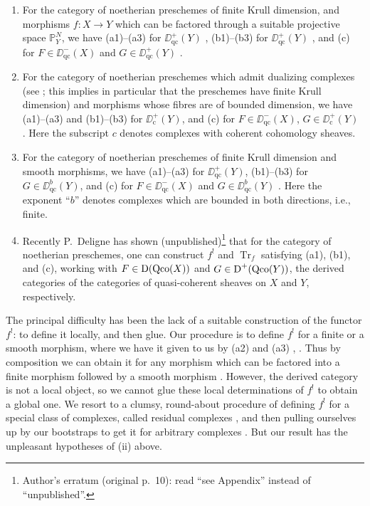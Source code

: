 \begin{enumerate}
	\item[(i)] For the category of noetherian preschemes of finite Krull dimension, and morphisms $f\colon X\to Y$ which can be factored through a suitable projective space $\mathbb{P}_{Y}^{N}$, we have (a1)--(a3) for $\DD_{\mathrm{qc}}^{+}(Y)$ , (b1)--(b3) for $\DD_{\mathrm{qc}}^{+}(Y)$ , and (c) for $F\in \DD_{\mathrm{qc}}^{-}(X)$ and $G\in \DD_{\mathrm{qc}}^{+}(Y)$ .
	
	\item[(ii)] For the category of noetherian preschemes which admit dualizing complexes (see ; this implies in particular that the preschemes have finite Krull dimension) and morphisms whose fibres are of bounded dimension, we have (a1)--(a3) and (b1)--(b3) for $\DD_{\mathrm{c}}^{+}(Y)$, and (c) for $F\in \DD_{\mathrm{qc}}^{-}(X)$, $G\in \DD_{\mathrm{c}}^{+}(Y)$ . Here the subscript $c$ denotes complexes with coherent cohomology sheaves.
	
	\item[(iii)] For the category of noetherian preschemes of finite Krull dimension and smooth morphisms, we have (a1)--(a3) for $\DD_{\mathrm{qc}}^{+}(Y)$, (b1)--(b3) for $G\in \DD_{\mathrm{qc}}^{b}(Y)$, and (c) for $F\in \DD_{\mathrm{qc}}^{-}(X)$ and $G\in \DD_{\mathrm{qc}}^{b}(Y)$ . Here the exponent ``$b$'' denotes complexes which are bounded in both directions, i.e., finite.
	
	\item[(iv)] Recently P.~Deligne has shown (unpublished)\footnote{Author's erratum (original p.~10): read ``see Appendix'' instead of ``unpublished''.} that for the category of noetherian preschemes, one can construct $f^{!}$ and $\operatorname{Tr}_{f}$ satisfying (a1), (b1), and (c), working with $F\in \operatorname{D}(\operatorname{Qco}(X))$ and $G\in \operatorname{D}^{+}(\operatorname{Qco}(Y))$, the derived categories of the categories of quasi-coherent sheaves on $X$ and $Y$, respectively.
\end{enumerate}

The principal difficulty has been the lack of a suitable construction of the functor $f^{!}$: to define it locally, and then glue. Our procedure is to define $f^{!}$ for a finite or a smooth morphism, where we have it given to us by (a2) and (a3) , . Thus by composition we can obtain it for any morphism which can be factored into a finite morphism followed by a smooth morphism . However, the derived category is not a local object, so we cannot glue these local determinations of $f^{!}$ to obtain a global one. We resort to a clumsy, round-about procedure of defining $f^{!}$ for a special class of complexes, called residual complexes , and then pulling ourselves up by our bootstraps to get it for arbitrary complexes . But our result has the unpleasant hypotheses of (ii) above.

